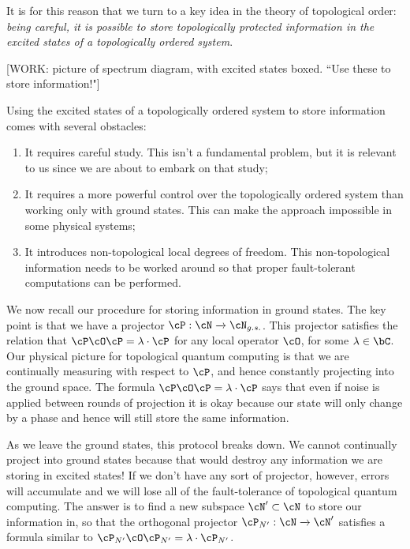 It is for this reason that we turn to a key idea in the theory of topological order: \textit{being careful, it is possible to store topologically protected information in the excited states of a topologically ordered system}.

[WORK: picture of spectrum diagram, with excited states boxed. ``Use these to store information!"]

Using the excited states of a topologically ordered system to store information comes with several obstacles:

\begin{enumerate}
\item It requires careful study. This isn't a fundamental problem, but it is relevant to us since we are about to embark on that study;
\item It requires a more powerful control over the topologically ordered system than working only with ground states. This can make the approach impossible in some physical systems;
\item It introduces non-topological local degrees of freedom. This non-topological information needs to be worked around so that proper fault-tolerant computations can be performed.
\end{enumerate}

We now recall our procedure for storing information in ground states. The key point is that we have a projector $\cP:\cN\xrightarrow{}\cN_{g.s.}$. This projector satisfies the relation that $\cP \cO \cP = \lambda\cdot \cP$ for any local operator $\cO$, for some $\lambda\in \bC$. Our physical picture for topological quantum computing is that we are continually measuring with respect to $\cP$, and hence constantly projecting into the ground space. The formula $\cP \cO \cP = \lambda \cdot \cP$ says that even if noise is applied between rounds of projection it is okay because our state will only change by a phase and hence will still store the same information.

As we leave the ground states, this protocol breaks down. We cannot continually project into ground states because that would destroy any information we are storing in excited states! If we don't have any sort of projector, however, errors will accumulate and we will lose all of the fault-tolerance of topological quantum computing. The answer is to find a new subspace $\cN' \subset \cN$ to store our information in, so that the orthogonal projector $\cP_{N'}: \cN \xrightarrow{} \cN'$ satisfies a formula similar to $\cP_{N'}\cO \cP_{N'}=\lambda\cdot \cP_{N'}$.

